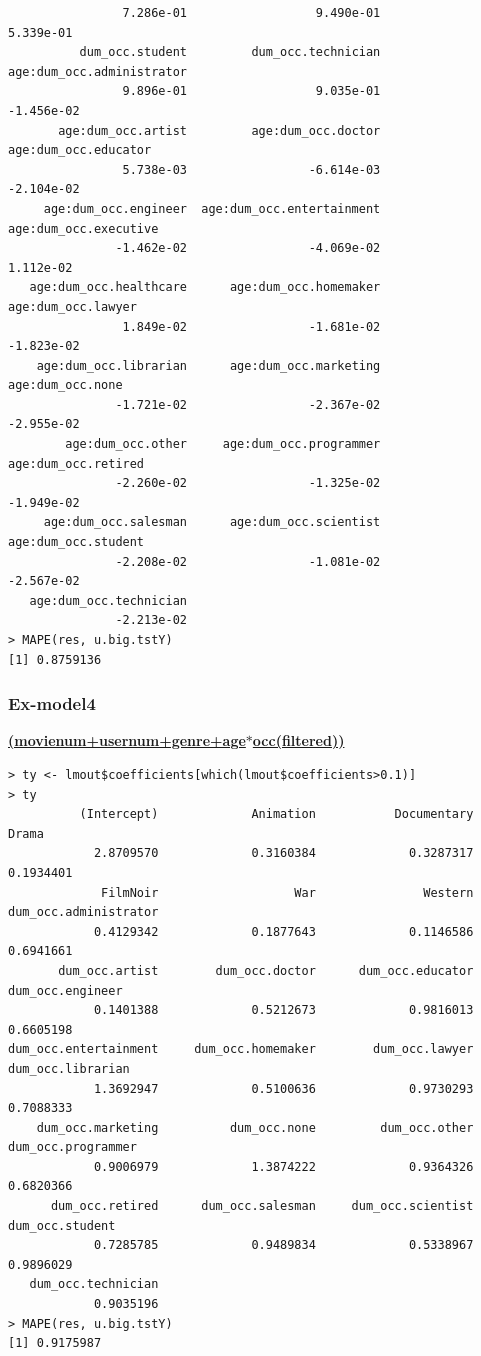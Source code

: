 \documentclass[11pt]{article}
\begin{document}
\begin{verbatim}
                7.286e-01                  9.490e-01                  5.339e-01  
          dum_occ.student         dum_occ.technician  age:dum_occ.administrator  
                9.896e-01                  9.035e-01                 -1.456e-02  
       age:dum_occ.artist         age:dum_occ.doctor       age:dum_occ.educator  
                5.738e-03                 -6.614e-03                 -2.104e-02  
     age:dum_occ.engineer  age:dum_occ.entertainment      age:dum_occ.executive  
               -1.462e-02                 -4.069e-02                  1.112e-02  
   age:dum_occ.healthcare      age:dum_occ.homemaker         age:dum_occ.lawyer  
                1.849e-02                 -1.681e-02                 -1.823e-02  
    age:dum_occ.librarian      age:dum_occ.marketing           age:dum_occ.none  
               -1.721e-02                 -2.367e-02                 -2.955e-02  
        age:dum_occ.other     age:dum_occ.programmer        age:dum_occ.retired  
               -2.260e-02                 -1.325e-02                 -1.949e-02  
     age:dum_occ.salesman      age:dum_occ.scientist        age:dum_occ.student  
               -2.208e-02                 -1.081e-02                 -2.567e-02  
   age:dum_occ.technician  
               -2.213e-02  
> MAPE(res, u.big.tstY)
[1] 0.8759136
\end{verbatim}

\subsubsection{Ex-model4}
\textbf{\underline{(movienum+usernum+genre+age$*$occ(filtered))}}
\begin{verbatim}
> ty <- lmout$coefficients[which(lmout$coefficients>0.1)]
> ty
          (Intercept)             Animation           Documentary                 Drama 
            2.8709570             0.3160384             0.3287317             0.1934401 
             FilmNoir                   War               Western dum_occ.administrator 
            0.4129342             0.1877643             0.1146586             0.6941661 
       dum_occ.artist        dum_occ.doctor      dum_occ.educator      dum_occ.engineer 
            0.1401388             0.5212673             0.9816013             0.6605198 
dum_occ.entertainment     dum_occ.homemaker        dum_occ.lawyer     dum_occ.librarian 
            1.3692947             0.5100636             0.9730293             0.7088333 
    dum_occ.marketing          dum_occ.none         dum_occ.other    dum_occ.programmer 
            0.9006979             1.3874222             0.9364326             0.6820366 
      dum_occ.retired      dum_occ.salesman     dum_occ.scientist       dum_occ.student 
            0.7285785             0.9489834             0.5338967             0.9896029 
   dum_occ.technician 
            0.9035196
> MAPE(res, u.big.tstY)
[1] 0.9175987
\end{verbatim}
\end{document}
